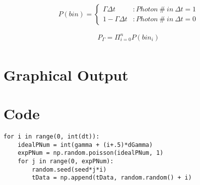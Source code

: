 \documentclass[aps,letterpaper,10pt]{revtex4}
\begin{document}
\begin{displaymath}
   P(bin) = \left\{
     \begin{array}{lr}
       \Gamma \Delta t & : Photon\ \#\ in\ \Delta t = 1\\
       1-\Gamma \Delta t & : Photon\ \#\ in\ \Delta t = 0
     \end{array}
   \right.
\end{displaymath}

\begin{gather*}
	P_\Gamma = \Pi_{i = 0}^{n} P(bin_i)\\
\end{gather*}

\vspace{3mm} 

\section{Graphical Output}

\begin{figure}[h!]
\vspace{3mm}
\end{figure}

\begin{figure}[h!]
\vspace{3mm}
\end{figure}

\begin{figure}[h!]
\vspace{3mm}
\end{figure}

\section{Code}

\begin{verbatim}
for i in range(0, int(dt)):
    idealPNum = int(gamma + (i+.5)*dGamma)
    expPNum = np.random.poisson(idealPNum, 1)
    for j in range(0, expPNum):
        random.seed(seed*j*i)
        tData = np.append(tData, random.random() + i)
\end{verbatim}
\end{document}
